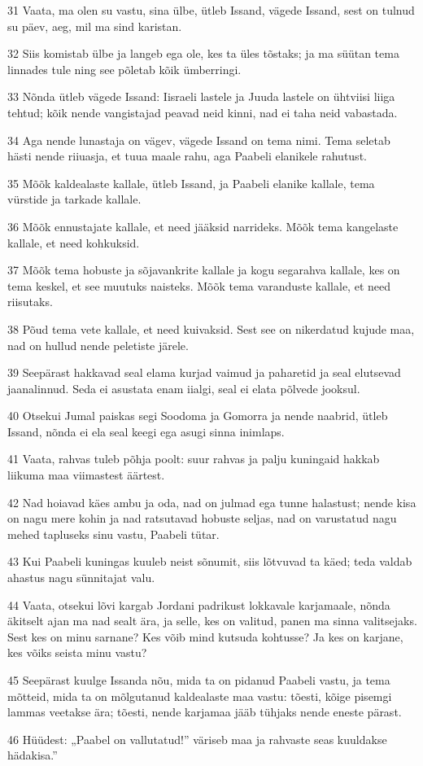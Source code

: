 \par 31 Vaata, ma olen su vastu, sina ülbe, ütleb Issand, vägede Issand, sest on tulnud su päev, aeg, mil ma sind karistan.
\par 32 Siis komistab ülbe ja langeb ega ole, kes ta üles tõstaks; ja ma süütan tema linnades tule ning see põletab kõik ümberringi.
\par 33 Nõnda ütleb vägede Issand: Iisraeli lastele ja Juuda lastele on ühtviisi liiga tehtud; kõik nende vangistajad peavad neid kinni, nad ei taha neid vabastada.
\par 34 Aga nende lunastaja on vägev, vägede Issand on tema nimi. Tema seletab hästi nende riiuasja, et tuua maale rahu, aga Paabeli elanikele rahutust.
\par 35 Mõõk kaldealaste kallale, ütleb Issand, ja Paabeli elanike kallale, tema vürstide ja tarkade kallale.
\par 36 Mõõk ennustajate kallale, et need jääksid narrideks. Mõõk tema kangelaste kallale, et need kohkuksid.
\par 37 Mõõk tema hobuste ja sõjavankrite kallale ja kogu segarahva kallale, kes on tema keskel, et see muutuks naisteks. Mõõk tema varanduste kallale, et need riisutaks.
\par 38 Põud tema vete kallale, et need kuivaksid. Sest see on nikerdatud kujude maa, nad on hullud nende peletiste järele.
\par 39 Seepärast hakkavad seal elama kurjad vaimud ja paharetid ja seal elutsevad jaanalinnud. Seda ei asustata enam iialgi, seal ei elata põlvede jooksul.
\par 40 Otsekui Jumal paiskas segi Soodoma ja Gomorra ja nende naabrid, ütleb Issand, nõnda ei ela seal keegi ega asugi sinna inimlaps.
\par 41 Vaata, rahvas tuleb põhja poolt: suur rahvas ja palju kuningaid hakkab liikuma maa viimastest äärtest.
\par 42 Nad hoiavad käes ambu ja oda, nad on julmad ega tunne halastust; nende kisa on nagu mere kohin ja nad ratsutavad hobuste seljas, nad on varustatud nagu mehed tapluseks sinu vastu, Paabeli tütar.
\par 43 Kui Paabeli kuningas kuuleb neist sõnumit, siis lõtvuvad ta käed; teda valdab ahastus nagu sünnitajat valu.
\par 44 Vaata, otsekui lõvi kargab Jordani padrikust lokkavale karjamaale, nõnda äkitselt ajan ma nad sealt ära, ja selle, kes on valitud, panen ma sinna valitsejaks. Sest kes on minu sarnane? Kes võib mind kutsuda kohtusse? Ja kes on karjane, kes võiks seista minu vastu?
\par 45 Seepärast kuulge Issanda nõu, mida ta on pidanud Paabeli vastu, ja tema mõtteid, mida ta on mõlgutanud kaldealaste maa vastu: tõesti, kõige pisemgi lammas veetakse ära; tõesti, nende karjamaa jääb tühjaks nende eneste pärast.
\par 46 Hüüdest: „Paabel on vallutatud!” väriseb maa ja rahvaste seas kuuldakse hädakisa.”

